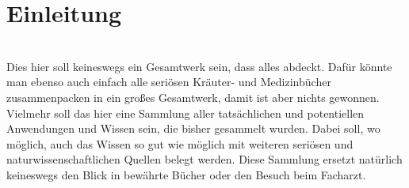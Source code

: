 \chapter{Einleitung}


\lipsum[1-2]\\

Dies hier soll keineswegs ein Gesamtwerk sein, dass alles abdeckt. Dafür könnte man ebenso auch einfach alle seriösen Kräuter- und Medizinbücher zusammenpacken in ein großes Gesamtwerk, damit ist aber nichts gewonnen. Vielmehr soll das hier eine Sammlung aller tatsächlichen und potentiellen Anwendungen und Wissen sein, die bisher gesammelt wurden. Dabei soll, wo möglich, auch das Wissen so gut wie möglich mit weiteren seriösen und naturwissenschaftlichen Quellen belegt werden. Diese Sammlung ersetzt natürlich keineswegs den Blick in bewährte Bücher oder den Besuch beim Facharzt.\\
 
\lipsum[1-2]